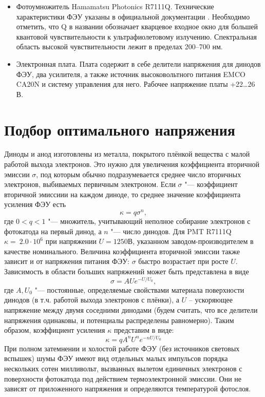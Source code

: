 \documentclass[12pt,a4paper]{report} %
\begin{document}
\begin{itemize}
	\item Фотоумножитель Hamamatsu Photonics R7111Q. Технические характеристики ФЭУ указаны в официальной документации \cite{Hamamatsu}. Необходимо отметить, что Q  в названии обозначает кварцевое входное окно для большей квантовой чувствительности к ультрафиолетовому излучению. Спектральная область высокой чувствительности лежит в пределах 200--700 нм. 
	\item Электронная плата. Плата содержит в себе делители напряжения для динодов ФЭУ, два усилителя, а также источник высоковольтного питания EMCO CA20N и систему управления для него. Рабочее напряжение платы +22\dots26 В. 
\end{itemize}

\section{Подбор оптимального напряжения}
Диноды и анод изготовлены из металла, покрытого плёнкой вещества с малой работой выхода электронов. Это нужно для увеличения коэффициента вторичной эмиссии $\sigma$, под которым обычно подразумевается среднее число вторичных электронов, выбиваемых первичным электроном. Если $\sigma$ "--- коэффициент вторичной эмиссиии на каждом диноде, то среднее значение коэффициента усиления ФЭУ есть 
\begin{equation}
	\kappa = q\sigma^n, 
\end{equation}
где $0 <q <1$ "--- множитель, учитывающий неполное собирание электронов с фотокатода на первый динод, а $n$ "--- число динодов. Для PMT R7111Q $\kappa= ~2.0\cdot10^6$ при напряжении $U = 1250 В$, указанном заводом-производителем в качестве номинального. Величина коэффициента вторичной эмиссии также зависит и от напряжения питания ФЭУ: $\sigma$ быстро возрастает при росте $U$. Зависимость в области больших напряжений может быть представлена в виде
\begin{equation}
	\sigma = AUe^{-U/U_0},
\end{equation}
где $A, U_0$ "--- постоянные, определяемые свойствами материала поверхности динодов (в т.ч. работой выхода электронов с плёнки), а $U$ -- ускоряющее напряжение между двумя соседними динодами (будем считать, что все делители напряжения одинаковы, и потенциалы распределены равномерно). Таким образом, коэффициент усиления $\kappa$ представим в виде:
\begin{equation}
	\kappa = qA^nU^ne^{-nU/U_0} 
\end{equation}
При полном затемнении и холостой работе ФЭУ (без источников световых вспышек) шумы ФЭУ имеют вид отдельных малых импульсов порядка нескольких сотен милливольт, вызванных вылетом единичных электронов с поверхности фотокатода под действием термоэлектронной эмиссии. Они не зависят от приложенного напряжения и определяются температурой фотослоя. 
\end{document}
